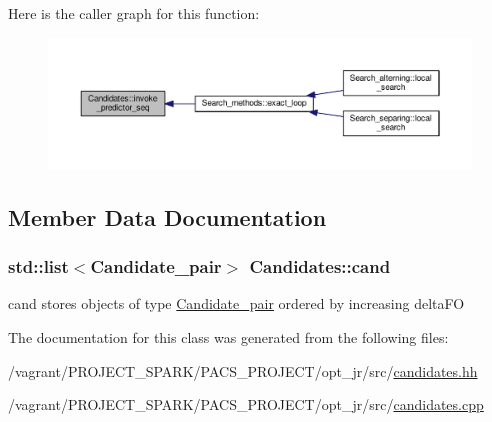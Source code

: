 Here is the caller graph for this function\-:
\nopagebreak
\begin{figure}[H]
\begin{center}
\leavevmode
\includegraphics[width=350pt]{classCandidates_a0f5bfe459063108d80ed8dce02c6c07b_icgraph}
\end{center}
\end{figure}




\subsection{Member Data Documentation}
\hypertarget{classCandidates_a45b43ae5f71d2162f591e4019f1bc560}{
\subsubsection[{cand}]{\setlength{\rightskip}{0pt plus 5cm}std\-::list$<${\bf Candidate\-\_\-pair}$>$ Candidates\-::cand\hspace{0.3cm}{\ttfamily [private]}}}\label{classCandidates_a45b43ae5f71d2162f591e4019f1bc560}


cand stores objects of type \hyperlink{classCandidate__pair}{Candidate\-\_\-pair} ordered by increasing delta\-F\-O 



The documentation for this class was generated from the following files\-:\begin{DoxyCompactItemize}
\item 
/vagrant/\-P\-R\-O\-J\-E\-C\-T\-\_\-\-S\-P\-A\-R\-K/\-P\-A\-C\-S\-\_\-\-P\-R\-O\-J\-E\-C\-T/opt\-\_\-jr/src/\hyperlink{candidates_8hh}{candidates.\-hh}\item 
/vagrant/\-P\-R\-O\-J\-E\-C\-T\-\_\-\-S\-P\-A\-R\-K/\-P\-A\-C\-S\-\_\-\-P\-R\-O\-J\-E\-C\-T/opt\-\_\-jr/src/\hyperlink{candidates_8cpp}{candidates.\-cpp}\end{DoxyCompactItemize}
